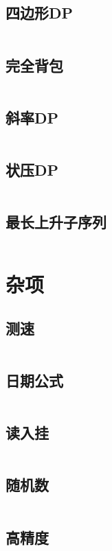 \documentclass[UTF8]{ctexart}
\begin{document}
\subsection{四边形DP}
\inputminted{cpp}{dp/四边形dp.cpp}

\subsection{完全背包}
\inputminted{cpp}{dp/完全背包.cpp}

\subsection{斜率DP}
\inputminted{cpp}{dp/斜率dp.cpp}

\subsection{状压DP}
\inputminted{cpp}{dp/状压dp.cpp}

\subsection{最长上升子序列}
\inputminted{cpp}{dp/最长上升子序列.cpp}

\section{杂项}

\subsection{测速}
\inputminted{cpp}{others/chrono.cpp}

\subsection{日期公式}
\inputminted{cpp}{others/date.cpp}

\subsection{读入挂}
\inputminted{cpp}{others/fread.cpp}

\subsection{随机数}
\inputminted{cpp}{others/随机数.cpp}

\subsection{高精度}
\inputminted{cpp}{others/高精度1.cpp}
\end{document}
